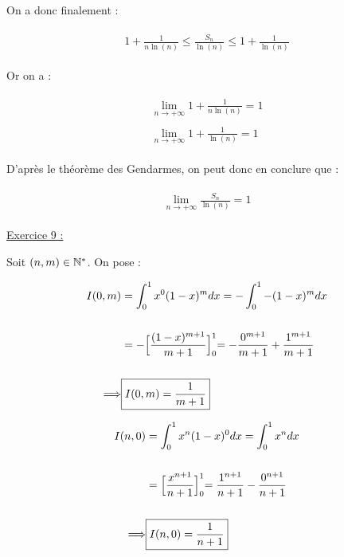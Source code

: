\documentclass{article}
\begin{document}
\bigskip

On a donc finalement :

\begin{align}
\begin{split}
\boxed{1+\frac{1}{n\ln(n)}\leq \frac{S_n}{\ln(n)} \leq 1+\frac{1}{\ln(n)}}
\end{split}
\end{align}

Or on a :

\begin{align}
\begin{split}
\lim_{n\rightarrow+\infty}1+\frac{1}{n\ln(n)} = 1\\\\
\lim_{n\rightarrow+\infty}1+\frac{1}{\ln(n)} = 1
\end{split}
\end{align}

\bigskip
\bigskip

D'après le théorème des Gendarmes, on peut donc en conclure que :

\begin{align}
\begin{split}
\boxed{\lim_{n\rightarrow+\infty}\frac{S_n}{\ln(n)}=1}
\end{split}
\end{align}

\newpage

\normalsize

\underline{Exercice 9 :}

\footnotesize

\bigskip
\bigskip
\bigskip

Soit $(n, m)\in\mathbb{N}^*$. On pose :

\begin{align}
\begin{split}
I(0, m) &= \int_0^1 x^0 (1-x)^m dx = -\int_0^1-(1-x)^mdx\\\\
&=-\Bigl[\frac{(1-x)^{m+1}}{m+1}\Bigl]_0^1=-\frac{0^{m+1}}{m+1} + \frac{1^{m+1}}{m+1}\\\\
\Longrightarrow& \boxed{I(0, m) = \frac{1}{m+1}}
\end{split}
\end{align}

\bigskip
\bigskip

\begin{align}
\begin{split}
I(n, 0) &= \int_0^1 x^n (1-x)^0 dx = \int_0^1 x^n dx\\\\
&=\Bigl[\frac{x^{n+1}}{n+1}\Bigl]_0^1 = \frac{1^{n+1}}{n+1}-\frac{0^{n+1}}{n+1}\\\\
\Longrightarrow& \boxed{I(n, 0) = \frac{1}{n+1}}
\end{split}
\end{align}
\end{document}
